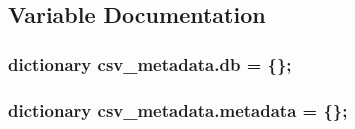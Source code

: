 \subsection{Variable Documentation}
\subsubsection[{\texorpdfstring{db}{db}}]{\setlength{\rightskip}{0pt plus 5cm}dictionary csv\+\_\+metadata.\+db = \{\};}\hypertarget{namespacecsv__metadata_a420b92194841cb3f4c75f0a5e3d9b11a}{}\label{namespacecsv__metadata_a420b92194841cb3f4c75f0a5e3d9b11a}
\subsubsection[{\texorpdfstring{metadata}{metadata}}]{\setlength{\rightskip}{0pt plus 5cm}dictionary csv\+\_\+metadata.\+metadata = \{\};}\hypertarget{namespacecsv__metadata_aaa78faa581bc02a7969a61a25e9fe02d}{}\label{namespacecsv__metadata_aaa78faa581bc02a7969a61a25e9fe02d}
